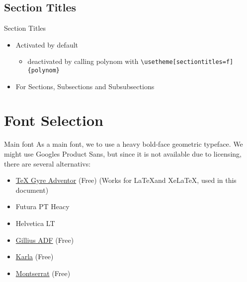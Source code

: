 \documentclass[fragile=singleslide]{beamer}
\begin{document}
\subsection{Section Titles}
\begin{frame}{Section Titles}
  \begin{itemize}
  \item Activated by default
    \begin{itemize}
    \item deactivated by calling polynom with \texttt{\textbackslash usetheme[sectiontitles=f]\{polynom\}}
    \end{itemize}
  \item For Sections, Subsections and Subsubsections
  \end{itemize}
\end{frame}



\section{Font Selection}
\begin{frame}{Main font}
  As a main font, we to use a heavy bold-face geometric typeface.  We
  might use Googles Product Sans, but since it is not available due to
  licensing, there are several alternativs:  
  \begin{itemize}
  \item \href{http://www.tug.dk/FontCatalogue/texgyreadventor/}{\TeX
      Gyre Adventor} (Free) (Works for \LaTeX and Xe\LaTeX, used in this document)
  \item Futura PT Heacy
  \item Helvetica LT
  \item \href{https://www.1001fonts.com/gillius-adf-font.html}{Gillius
      ADF} (Free)
  \item \href{https://fonts.google.com/specimen/Karla}{Karla} (Free)
  \item \href{https://fonts.google.com/specimen/Montserrat}{Montserrat} (Free)
  \end{itemize}
\end{frame}
\end{document}
